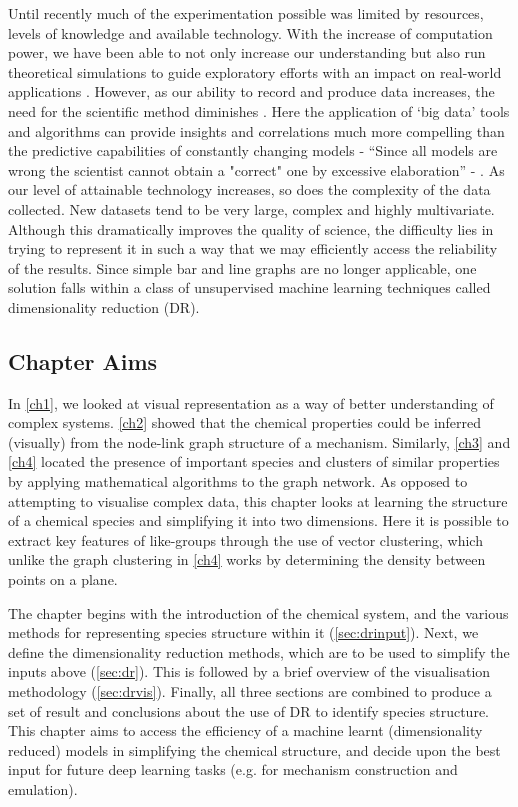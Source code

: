Until recently much of the experimentation possible was limited by resources, levels of knowledge and available technology. With the increase of computation power, we have been able to not only increase our understanding but also run theoretical simulations to guide exploratory efforts with an impact on real-world applications \citep{dft,lion,theoreticalbio,drug}. However, as our ability to record and produce data increases, the need for the scientific method diminishes \citep{wired}. Here the application of `big data' tools and algorithms can provide insights and correlations much more compelling than the predictive capabilities of constantly changing models - ``Since all models are wrong the scientist cannot obtain
a "correct" one by excessive elaboration'' - \cite{allmodels}. As our level of attainable technology increases, so does the complexity of the data collected. New datasets tend to be very large, complex and highly multivariate. Although this dramatically improves the quality of science, the difficulty lies in trying to represent it in such a way that we may efficiently access the reliability of the results. Since simple bar and line graphs are no longer applicable, one solution falls within a class of unsupervised machine learning techniques called dimensionality reduction (DR).


\subsection{Chapter Aims}
In \autoref{ch1}, we looked at visual representation as a way of better understanding of complex systems. \autoref{ch2} showed that the chemical properties could be inferred (visually) from the node-link graph structure of a mechanism. Similarly, \autoref{ch3} and \autoref{ch4} located the presence of important species and clusters of similar properties by applying mathematical algorithms to the graph network. As opposed to attempting to visualise complex data, this chapter looks at learning the structure of a chemical species and simplifying it into two dimensions. Here it is possible to extract key features of like-groups through the use of vector clustering, which unlike the graph clustering in \autoref{ch4} works by determining the density between points on a plane.

The chapter begins with the introduction of the chemical system, and the various methods for representing species structure within it (\autoref{sec:drinput}). Next, we define the dimensionality reduction methods, which are to be used to simplify the inputs above (\autoref{sec:dr}). This is followed by a brief overview of the visualisation methodology (\autoref{sec:drvis}). Finally, all three sections are combined to produce a set of result and conclusions about the use of DR to identify species structure. This chapter aims to access the efficiency of a machine learnt (dimensionality reduced) models in simplifying the chemical structure, and decide upon the best input for future deep learning tasks (e.g. for mechanism construction and emulation).




